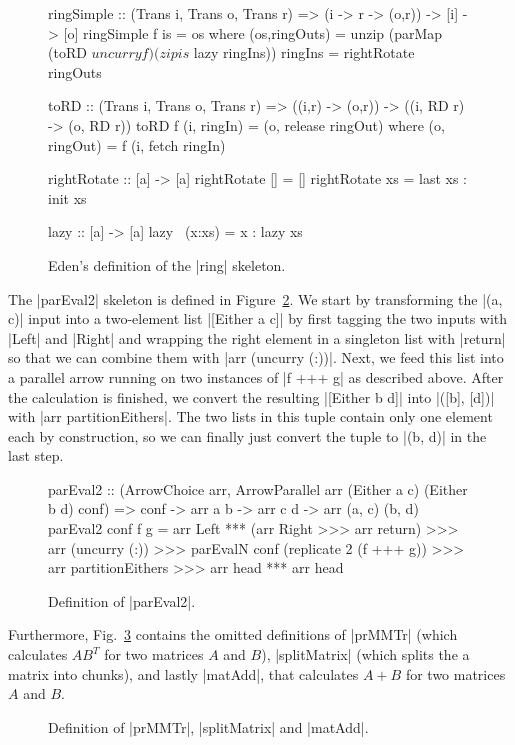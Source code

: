 \begin{figure}[h]
\begin{code}
ringSimple :: (Trans i, Trans o, Trans r) => (i -> r -> (o,r)) -> [i] -> [o]
ringSimple f is =  os
  where (os,ringOuts) = unzip (parMap (toRD $ uncurry f) (zip is $ lazy ringIns))
        ringIns = rightRotate ringOuts

toRD :: (Trans i, Trans o, Trans r) => ((i,r) -> (o,r)) -> ((i, RD r) -> (o, RD r))
toRD  f (i, ringIn)  = (o, release ringOut)
  where (o, ringOut) = f (i, fetch ringIn)

rightRotate    :: [a] -> [a]
rightRotate [] =  []
rightRotate xs =  last xs : init xs

lazy :: [a] -> [a]
lazy ~(x:xs) = x : lazy xs
\end{code}
\caption{Eden's definition of the |ring| skeleton.}
\label{fig:ringEden}
\end{figure}

The |parEval2| skeleton is defined in Figure~\ref{fig:parEval2}. 
We start by transforming the |(a, c)| input into a two-element list |[Either a c]| by first tagging the two inputs with |Left| and |Right| and wrapping the right element in a singleton list with |return| so that we can combine them with |arr (uncurry (:))|. Next, we feed this list into a parallel arrow running on two instances of |f +++ g| as described above. After the calculation is finished, we convert the resulting |[Either b d]| into |([b], [d])| with |arr partitionEithers|. The two lists in this tuple contain only one element each by construction, so we can finally just convert the tuple to |(b, d)| in the last step.
\begin{figure}[h]
\begin{code}
parEval2 :: (ArrowChoice arr,
	ArrowParallel arr (Either a c) (Either b d) conf) =>
	conf -> arr a b -> arr c d -> arr (a, c) (b, d)
parEval2 conf f g =
	arr Left *** (arr Right >>> arr return) >>>
	arr (uncurry (:)) >>>
	parEvalN conf (replicate 2 (f +++ g)) >>>
	arr partitionEithers >>>
	arr head *** arr head
\end{code}
	\caption{Definition of |parEval2|.}
	\label{fig:parEval2}
\end{figure}
Furthermore, Fig.~\ref{fig:torus_example_rest} contains the omitted definitions of |prMMTr| (which calculates $AB^T$ for two matrices $A$ and $B$), |splitMatrix| (which splits the a matrix into chunks), and lastly |matAdd|, that calculates $A + B$ for two matrices $A$ and $B$.
\begin{figure}[h]
	\caption{Definition of |prMMTr|, |splitMatrix| and |matAdd|.}
	\label{fig:torus_example_rest}
\end{figure}

